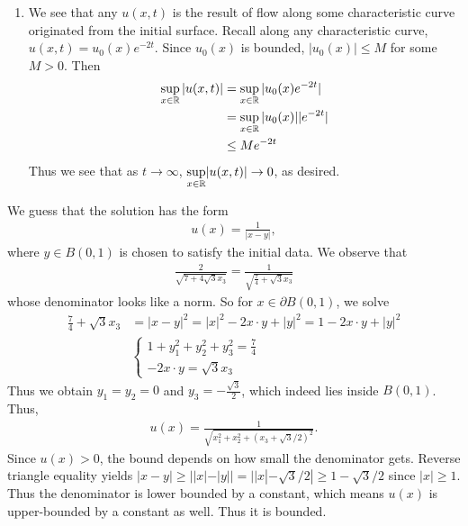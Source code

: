 \documentclass[12pt]{article}
\begin{document}
\begin{problem}[2]
\begin{enumerate}[label=(\alph*)]
\item We see that any $ u(x,t)$ is the result of flow along some characteristic curve originated from the initial surface. Recall along any characteristic curve, $ u(x,t) = u_0(x) e^{-2t}$. Since $ u_0(x)$ is bounded, $ |u_0(x)| \leq M$ for some $ M > 0$. Then
 \begin{align*}
	\sup_{x \in \mathbb{R}} |u(x,t)| &= \sup_{x \in \mathbb{R}} |u_0(x) e^{-2t}| \\
	&= \sup_{x \in \mathbb{R}}|u_0(x)| |e^{-2t}| \\
	&\leq M e^{-2t}  
\end{align*}
Thus we see that as $ t \to \infty$, $ \underset{ x \in \mathbb{R}}{ \sup}| u(x,t) |\to 0$, as desired.
\end{enumerate}
\end{problem}
\begin{problem}[3]
We guess that the solution has the form
\begin{align*}
	u(x) = \frac{1}{|x-y|},
\end{align*}
where $ y \in B(0,1)$ is chosen to satisfy the initial data. We observe that
\begin{align*}
	\frac{2}{\sqrt{7+4\sqrt{3}x_3 } } = \frac{1}{\sqrt{\frac{7}{4}+ \sqrt{3} x_3 } }
\end{align*}
whose denominator looks like a norm. So for $ x \in \partial B(0,1)$, we solve
\begin{align*}
	\frac{7}{4}+\sqrt{3}x_3 &= |x-y|^2 = |x|^2 - 2 x \cdot y +|y|^2 = 1- 2 x \cdot y +|y|^2 \\ 
				&\begin{cases}
		1+y_1^2+y_2^2+y_3^2 = \frac{7}{4}\\
		-2 x \cdot y = \sqrt{3}x_3 
	\end{cases}  
\end{align*}
Thus we obtain $ y_1 = y_2=0$ and $ y_3 = -\frac{\sqrt{3} }{ 2} $, which indeed lies inside $ B(0,1)$. Thus,
 \begin{align*}
	u(x) = \frac{1}{\sqrt{x_1^2+x_2^2+(x_3+ \sqrt{3}/2 )^2} } .
\end{align*}
Since $ u(x)>0$, the bound depends on how small the denominator gets. Reverse triangle equality yields $ |x-y|\geq ||x| - |y|| = ||x| - \sqrt{3}/2 | \geq 1- \sqrt{3}/2$ since $ |x|\geq 1$. Thus the denominator is lower bounded by a constant, which means  $ u(x)$ is upper-bounded by a constant as well. Thus it is bounded.

\end{problem}
\end{document}

